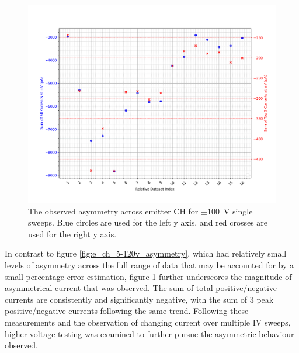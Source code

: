 \begin{refsection}
\begin{figure}[H]
    \centering
    \includegraphics[width=\linewidth]{Chapter7/Figs/Raster/Emitters/124-145_asymmetry.png}
    \caption{The observed asymmetry across emitter CH for $\pm100$~\si{\volt} single sweeps. Blue circles are used for the left y axis, and red crosses are used for the right y axis.}
    \label{fig:e_ch_124-145_asymmetry}
\end{figure}

In contrast to figure \ref{fig:e_ch_5-120v_asymmetry}, which had relatively small levels of asymmetry across the full range of data that may be accounted for by a small percentage error estimation, figure \ref{fig:e_ch_124-145_asymmetry} further underscores the magnitude of asymmetrical current that was observed. The sum of total positive/negative currents are consistently and significantly negative, with the sum of 3 peak positive/negative currents following the same trend. Following these measurements and the observation of changing current over multiple IV sweeps, higher voltage testing was examined to further pursue the asymmetric behaviour observed.


\end{refsection}

